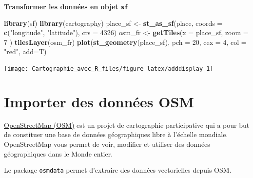 \documentclass[]{book}
\newenvironment{Shaded}{\begin{snugshade}}{\end{snugshade}}
\newcommand{\KeywordTok}[1]{\textcolor[rgb]{0.13,0.29,0.53}{\textbf{#1}}}
\newcommand{\DataTypeTok}[1]{\textcolor[rgb]{0.13,0.29,0.53}{#1}}
\newcommand{\DecValTok}[1]{\textcolor[rgb]{0.00,0.00,0.81}{#1}}
\newcommand{\StringTok}[1]{\textcolor[rgb]{0.31,0.60,0.02}{#1}}
\newcommand{\NormalTok}[1]{#1}
\begin{document}
\textbf{Transformer les données en objet \texttt{sf}}

\begin{Shaded}
\begin{Highlighting}[]
\KeywordTok{library}\NormalTok{(sf)}
\KeywordTok{library}\NormalTok{(cartography)}
\NormalTok{place_sf <-}\StringTok{ }\KeywordTok{st_as_sf}\NormalTok{(place, }\DataTypeTok{coords =} \KeywordTok{c}\NormalTok{(}\StringTok{"longitude"}\NormalTok{, }\StringTok{"latitude"}\NormalTok{), }\DataTypeTok{crs =} \DecValTok{4326}\NormalTok{)}
\NormalTok{osm_fr <-}\StringTok{ }\KeywordTok{getTiles}\NormalTok{(}\DataTypeTok{x =}\NormalTok{ place_sf, }\DataTypeTok{zoom =} \DecValTok{7}\NormalTok{ )}
\KeywordTok{tilesLayer}\NormalTok{(osm_fr)}
\KeywordTok{plot}\NormalTok{(}\KeywordTok{st_geometry}\NormalTok{(place_sf), }\DataTypeTok{pch =} \DecValTok{20}\NormalTok{, }\DataTypeTok{cex =} \DecValTok{4}\NormalTok{, }\DataTypeTok{col =} \StringTok{"red"}\NormalTok{, }\DataTypeTok{add=}\NormalTok{T)}
\end{Highlighting}
\end{Shaded}

\begin{center}\texttt{[image: Cartographie\_avec\_R\_files/figure-latex/adddisplay-1]} \end{center}

\section{Importer des données OSM}\label{importer-des-donnees-osm}

\href{https://www.openstreetmap.org}{OpenStreetMap (OSM)} est un projet
de cartographie participative qui a pour but de constituer une base de
données géographiques libre à l'échelle mondiale. OpenStreetMap vous
permet de voir, modifier et utiliser des données géographiques dans le
Monde entier.

Le package \texttt{osmdata} \citep{R-osmdata} permet d'extraire des
données vectorielles depuis OSM.
\end{document}
